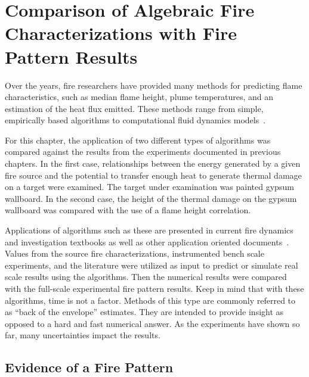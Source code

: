 \documentclass[twoside]{uocthesis}
\begin{document}
{\chapter{Comparison of Algebraic Fire Characterizations with Fire Pattern Results}

Over the years, fire researchers have provided many methods for predicting flame characteristics, such as median flame height, plume temperatures, and an estimation of the heat flux emitted. These methods range from simple, empirically based algorithms to computational fluid dynamics models~\cite{Beyler:1986,Beyler:1999,Heskestad:SFPE,FDS_Users_Guide,FDS_Tech_Guide}.  

For this chapter, the application of two different types of algorithms was compared against the results from the experiments documented in previous chapters.  In the first case, relationships between the energy generated by a given fire source and the potential to transfer enough heat to generate thermal damage on a target were examined. The target under examination was painted gypsum wallboard.  In the second case, the height of the thermal damage on the gypsum wallboard was compared with the use of a flame height correlation. 

Applications of algorithms such as these are presented in current fire dynamics and investigation textbooks as well as other application oriented documents~\cite{Icove:2013,Quintiere:1997,Asseal:2010,Beyler:1999,NUREG_1805}.  Values from the source fire characterizations, instrumented bench scale experiments, and the literature were utilized as input to predict or simulate real scale results using the algorithms.  Then the numerical results were compared with the full-scale experimental fire pattern results.  Keep in mind that with these algorithms, time is not a factor.  Methods of this type are commonly referred to as ``back of the envelope'' estimates.  They are intended to provide insight as opposed to a hard and fast numerical answer.  As the experiments have shown so far, many uncertainties impact the results.            

\section{Evidence of a Fire Pattern}

}
\end{document}
